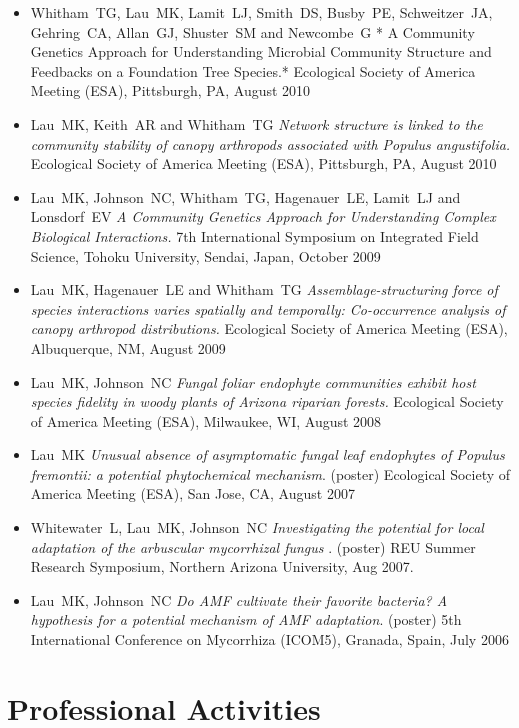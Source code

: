 \documentclass[a4paper]{article}
\begin{document}
\begin{itemize}
{  influence lichen interaction network structure.} Université Bordeaux
  1, Talence, France, December 2011
\item
  Whitham~TG, Lau~MK, Lamit~LJ, Smith~DS, Busby~PE, Schweitzer~JA,
  Gehring~CA, Allan~GJ, Shuster~SM and Newcombe~G * A Community Genetics
  Approach for Understanding Microbial Community Structure and Feedbacks
  on a Foundation Tree Species.* Ecological Society of America Meeting
  (ESA), Pittsburgh, PA, August 2010
\item
  Lau~MK, Keith~AR and Whitham~TG \emph{Network structure is linked to
  the community stability of canopy arthropods associated with Populus
  angustifolia.} Ecological Society of America Meeting (ESA),
  Pittsburgh, PA, August 2010
\item
  Lau~MK, Johnson~NC, Whitham~TG, Hagenauer~LE, Lamit~LJ and Lonsdorf~EV
  \emph{A Community Genetics Approach for Understanding Complex
  Biological Interactions.} 7th International Symposium on Integrated
  Field Science, Tohoku University, Sendai, Japan, October 2009
\item
  Lau~MK, Hagenauer~LE and Whitham~TG \emph{Assemblage-structuring force
  of species interactions varies spatially and temporally: Co-occurrence
  analysis of canopy arthropod distributions.} Ecological Society of
  America Meeting (ESA), Albuquerque, NM, August 2009
\item
  Lau~MK, Johnson~NC \emph{Fungal foliar endophyte communities exhibit
  host species fidelity in woody plants of Arizona riparian forests.}
  Ecological Society of America Meeting (ESA), Milwaukee, WI, August
  2008
\item
  Lau~MK \emph{Unusual absence of asymptomatic fungal leaf endophytes of
  Populus fremontii: a potential phytochemical mechanism}. (poster)
  Ecological Society of America Meeting (ESA), San Jose, CA, August 2007
\item
  Whitewater~L, Lau~MK, Johnson~NC \emph{Investigating the potential for
  local adaptation of the arbuscular mycorrhizal fungus} . (poster) REU
  Summer Research Symposium, Northern Arizona University, Aug 2007.
\item
  Lau~MK, Johnson~NC \emph{Do AMF cultivate their favorite bacteria? A
  hypothesis for a potential mechanism of AMF adaptation}. (poster) 5th
  International Conference on Mycorrhiza (ICOM5), Granada, Spain, July
  2006

\end{itemize}

\section{Professional Activities}\label{professional-activities}
\end{document}

